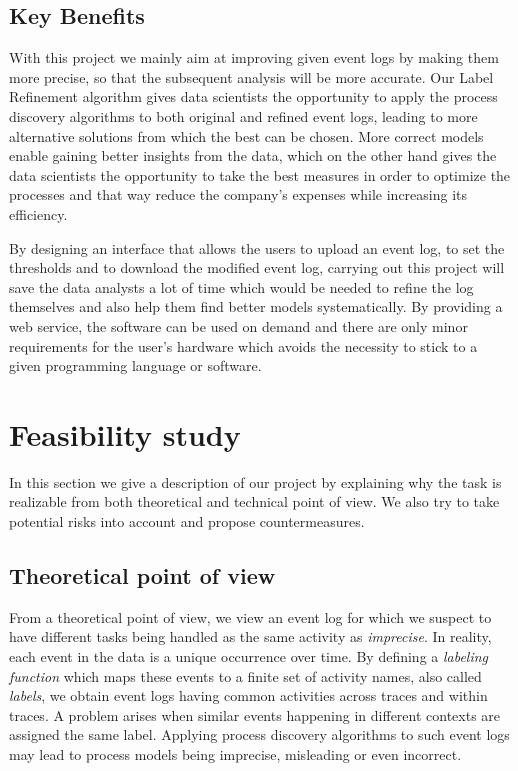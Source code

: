 \documentclass[notitlepage]{article}
\begin{document}
\begin{flushleft}
\subsection{Key Benefits}
 
With this project we mainly aim at improving given event logs by making them more precise, so that the subsequent analysis will be more accurate. 
Our Label Refinement algorithm gives data scientists the opportunity to apply the process discovery algorithms to both original and refined event logs, leading to more alternative solutions from which the best can be chosen.
More correct models enable gaining better insights from the data, which on the other hand gives the data scientists the opportunity to take the best measures in order to optimize the processes and that way reduce the company's expenses while increasing its efficiency.  

By designing an interface that allows the users to upload an event log, to set the thresholds and to download the modified event log, carrying out this project will save the data analysts a lot of time which would be needed to refine the log themselves and also help them find better models systematically. 
By providing a web service, the software can be used on demand and there are only minor requirements for the user's hardware which avoids the necessity to stick to a given programming language or software.




\section{Feasibility study}
In this section we give a description of our project by explaining why the task is realizable from both theoretical and technical point of view.
We also try to take potential risks into account and propose countermeasures.

\subsection{Theoretical point of view}

From a theoretical point of view, we view an event log for which we suspect to have different tasks being handled as the same activity as \textit{imprecise}.
In reality, each event in the data is a unique occurrence over time.
By defining a \textit{labeling  function} which maps these events to a finite set of activity names, also called \textit{labels}, we obtain event logs having common activities across traces and within traces.
A problem arises when similar events happening in different contexts are assigned the same label.
Applying process discovery algorithms to such event logs may lead to process models being imprecise, misleading or even incorrect.


\end{flushleft}
\end{document}
